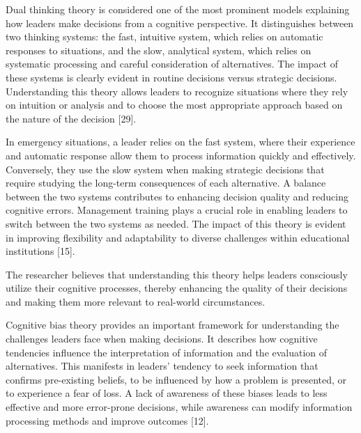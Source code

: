 \documentclass[10pt]{NSP1}
\begin{document}
\par\medskip{}\smallskip

Dual thinking theory is considered one of the most prominent models explaining how leaders make decisions from a cognitive perspective. It distinguishes between two thinking systems: the fast, intuitive system, which relies on automatic responses to situations, and the slow, analytical system, which relies on systematic processing and careful consideration of alternatives. The impact of these systems is clearly evident in routine decisions versus strategic decisions. Understanding this theory allows leaders to recognize situations where they rely on intuition or analysis and to choose the most appropriate approach based on the nature of the decision [29].

In emergency situations, a leader relies on the fast system, where their experience and automatic response allow them to process information quickly and effectively. Conversely, they use the slow system when making strategic decisions that require studying the long-term consequences of each alternative. A balance between the two systems contributes to enhancing decision quality and reducing cognitive errors. Management training plays a crucial role in enabling leaders to switch between the two systems as needed. The impact of this theory is evident in improving flexibility and adaptability to diverse challenges within educational institutions [15].

The researcher believes that understanding this theory helps leaders consciously utilize their cognitive processes, thereby enhancing the quality of their decisions and making them more relevant to real-world circumstances.

\par\medskip{}\smallskip

Cognitive bias theory provides an important framework for understanding the challenges leaders face when making decisions. It describes how cognitive tendencies influence the interpretation of information and the evaluation of alternatives. This manifests in leaders' tendency to seek information that confirms pre-existing beliefs, to be influenced by how a problem is presented, or to experience a fear of loss. A lack of awareness of these biases leads to less effective and more error-prone decisions, while awareness can modify information processing methods and improve outcomes [12].
\end{document}
